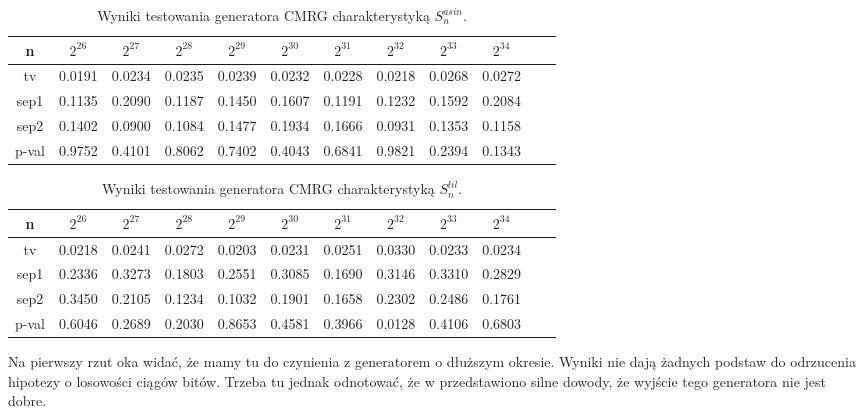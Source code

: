 \documentclass[a4paper,11pt,twoside]{book}
\newcommand{\Slil}[1]{S^{lil}_#1}
\newcommand{\Sasin}[1]{S^{asin}_#1}
\theoremstyle{definition}
\begin{document}
\begin{table}[ht!]
\centering
 \caption{Wyniki testowania generatora CMRG charakterystyką $\Sasin{n}$.}
 \label{tab:cmrg_asin}
\begin{tabular} {||c|c|c|c|c|c|c|c|c|c|c|c||}  
 \hline
     n &  $2^{26}$ &  $2^{27}$ &  $2^{28}$ &  $2^{29}$ &  $2^{30}$ &  $2^{31}$ &  $2^{32}$ &  $2^{33}$ &  $2^{34}$\\ \hline
     tv &  0.0191 &  0.0234 &  0.0235 &  0.0239 &  0.0232 &  0.0228 &  0.0218 &  0.0268 &  0.0272\\ \hline
   sep1 &  0.1135 &  0.2090 &  0.1187 &  0.1450 &  0.1607 &  0.1191 &  0.1232 &  0.1592 &  0.2084\\ \hline
   sep2 &  0.1402 &  0.0900 &  0.1084 &  0.1477 &  0.1934 &  0.1666 &  0.0931 &  0.1353 &  0.1158\\ \hline
  p-val &  0.9752 &  0.4101 &  0.8062 &  0.7402 &  0.4043 &  0.6841 &  0.9821 &  0.2394 &  0.1343\\ \hline
\end{tabular}  
\end{table}
\begin{table}[ht!]
\centering
 \caption{Wyniki testowania generatora CMRG charakterystyką $\Slil{n}$.}
 \label{tab:cmrg_lil}
\begin{tabular} {||c|c|c|c|c|c|c|c|c|c|c|c||}  
 \hline 
     n &  $2^{26}$ &  $2^{27}$ &  $2^{28}$ &  $2^{29}$ &  $2^{30}$ &  $2^{31}$ &  $2^{32}$ &  $2^{33}$ &  $2^{34}$\\ \hline
     tv &  0.0218 &  0.0241 &  0.0272 &  0.0203 &  0.0231 &  0.0251 &  0.0330 &  0.0233 &  0.0234\\ \hline
   sep1 &  0.2336 &  0.3273 &  0.1803 &  0.2551 &  0.3085 &  0.1690 &  0.3146 &  0.3310 &  0.2829\\ \hline
   sep2 &  0.3450 &  0.2105 &  0.1234 &  0.1032 &  0.1901 &  0.1658 &  0.2302 &  0.2486 &  0.1761\\ \hline
  p-val &  0.6046 &  0.2689 &  0.2030 &  0.8653 &  0.4581 &  0.3966 &  0.0128 &  0.4106 &  0.6803\\ \hline
\end{tabular}  
\end{table}
\FloatBarrier

  Na pierwszy rzut oka widać, że mamy tu do czynienia z generatorem o dłuższym okresie. Wyniki nie dają żadnych podstaw do odrzucenia hipotezy o losowości ciągów bitów. Trzeba tu jednak odnotować, że w \cite{kim-choe} przedstawiono silne dowody, że wyjście tego generatora nie jest dobre.
\end{document}
